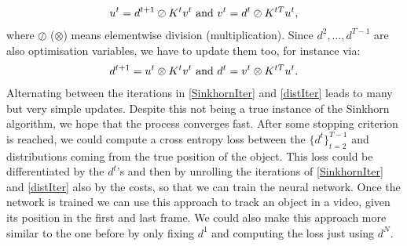 \documentclass{article}
\begin{document}
{\begin{align}\label{SinkhornIter}
u^t = d^{t+1} \oslash K^t v^t \textnormal{ and } v^t = d^t \oslash K^{tT} u^t,
\end{align}
where $\oslash$ ($\otimes$) means elementwise division (multiplication). Since $d^2, \dots, d^{T-1}$ are also optimisation variables, we have to update them too, for instance via:
\begin{align}\label{distIter}
d^{t+1} = u^t \otimes K^t v^t \textnormal{ and } d^t = v^t \otimes K^{tT} u^t.
\end{align}
Alternating between the iterations in \ref{SinkhornIter} and \ref{distIter} leads to many but very simple updates. Despite this not being a true instance of the Sinkhorn algorithm, we hope that the process converges fast. After some stopping criterion is reached, we could compute a cross entropy loss between the $\{d^t\}_{t=2}^{T-1}$ and distributions coming from the true position of the object. This loss could be differentiated by the $d^t$'s and then by unrolling the iterations of \ref{SinkhornIter} and \ref{distIter} also by the costs, so that we can train the neural network. Once the network is trained we can use this approach to track an object in a video, given its position in the first and last frame. We could also make this approach more similar to the one before by only fixing $d^1$ and computing the loss just using $d^N$.

}
\end{document}
